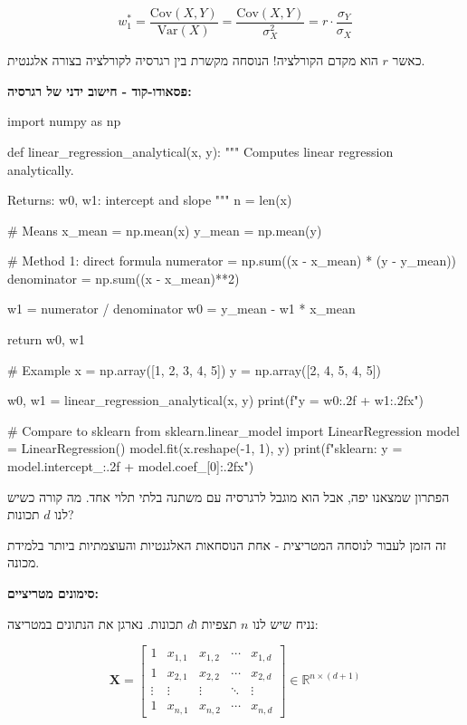 \begin{equation}
w_1^* = \frac{\text{Cov}(X, Y)}{\text{Var}(X)} = \frac{\text{Cov}(X, Y)}{\sigma_X^2} = r \cdot \frac{\sigma_Y}{\sigma_X}
\end{equation}

כאשר $r$ הוא מקדם הקורלציה! הנוסחה מקשרת בין רגרסיה לקורלציה בצורה אלגנטית.

\textbf{פסאודו-קוד - חישוב ידני של רגרסיה:}

\begin{pythonbox}
import numpy as np

def linear_regression_analytical(x, y):
    """
    Computes linear regression analytically.

    Returns:
        w0, w1: intercept and slope
    """
    n = len(x)

    # Means
    x_mean = np.mean(x)
    y_mean = np.mean(y)

    # Method 1: direct formula
    numerator = np.sum((x - x_mean) * (y - y_mean))
    denominator = np.sum((x - x_mean)**2)

    w1 = numerator / denominator
    w0 = y_mean - w1 * x_mean

    return w0, w1

# Example
x = np.array([1, 2, 3, 4, 5])
y = np.array([2, 4, 5, 4, 5])

w0, w1 = linear_regression_analytical(x, y)
print(f"y = {w0:.2f} + {w1:.2f}x")

# Compare to sklearn
from sklearn.linear_model import LinearRegression
model = LinearRegression()
model.fit(x.reshape(-1, 1), y)
print(f"sklearn: y = {model.intercept_:.2f} + {model.coef_[0]:.2f}x")
\end{pythonbox}


הפתרון שמצאנו יפה, אבל הוא מוגבל לרגרסיה עם משתנה בלתי תלוי אחד. מה קורה כשיש לנו $d$ תכונות?

זה הזמן לעבור לנוסחה המטריצית - אחת הנוסחאות האלגנטיות והעוצמתיות ביותר בלמידת מכונה.

\textbf{סימונים מטריציים:}

נניח שיש לנו $n$ תצפיות ו\en{-}$d$ תכונות. נארגן את הנתונים במטריצה:

\begin{equation}
\mathbf{X} = \begin{bmatrix}
1 & x_{1,1} & x_{1,2} & \cdots & x_{1,d} \\
1 & x_{2,1} & x_{2,2} & \cdots & x_{2,d} \\
\vdots & \vdots & \vdots & \ddots & \vdots \\
1 & x_{n,1} & x_{n,2} & \cdots & x_{n,d}
\end{bmatrix} \in \mathbb{R}^{n \times (d+1)}
\end{equation}

